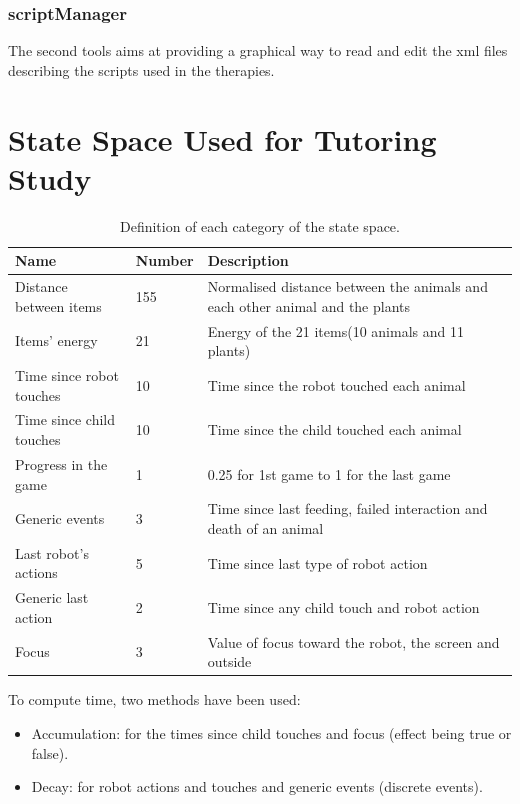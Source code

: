 \subsection{scriptManager}

The second tools aims at providing a graphical way to read and edit the xml files describing the scripts used in the therapies.

\cleartooddpage
\chapter{State Space Used for Tutoring Study} \label{app:state}
\begin{table}[ht]
	\centering
	\caption{Definition of each category of the state space.}
	\label{tab:tutoring_policies}
	\begin{tabularx}{\textwidth}{@{}llX@{}}\toprule
		Name & Number & Description \\
		\midrule
		Distance between items & 155 & Normalised distance between the animals and each other animal and the plants\\
		Items' energy & 21 & Energy of the 21 items(10 animals and 11 plants)\\
		Time since robot touches & 10 & Time since the robot touched each animal\\ %
		Time since child touches & 10 & Time since the child touched each animal\\ %
		Progress in the game & 1 & 0.25 for 1st game to 1 for the last game\\ 
		Generic events & 3 & Time since last feeding, failed interaction and death of an animal\\ %
		Last robot's actions & 5 & Time since last type of robot action\\ %
		Generic last action & 2 & Time since any child touch and robot action\\ %
		Focus & 3 & Value of focus toward the robot, the screen and outside\\ %
		\bottomrule
	\end{tabularx}
\end{table}

To compute time, two methods have been used:
\begin{itemize}
	\item Accumulation: for the times since child touches and focus (effect being true or false).
	\item Decay: for robot actions and touches and generic events (discrete events).
\end{itemize}

